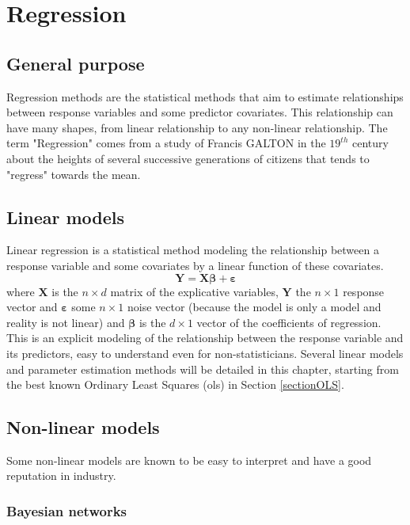 \documentclass[12pt,a4paper]{report}
\begin{document}
\section{Regression}
	\subsection{General purpose}
		Regression methods are the statistical methods that aim to estimate relationships between response variables and some predictor covariates. This relationship can have many shapes, from linear relationship to any non-linear relationship. The term "Regression" comes from a study of Francis GALTON in the $19^{th}$ century about the heights of several successive generations of citizens that tends to "regress" towards the mean. 
	
	\subsection{Linear models}
       Linear regression is a statistical method modeling the relationship between a response variable and some covariates by a linear function of these covariates.
			\begin{equation}
				\boldsymbol{Y}=\boldsymbol{X}\boldsymbol{\beta} + \boldsymbol{\varepsilon}
			\end{equation}
			where $\boldsymbol{X}$ is the $n\times d$ matrix of the explicative variables, %
	 $\boldsymbol{Y}$ the  $n\times 1$ response vector and $\boldsymbol{\varepsilon}$ some $n\times 1$ noise vector (because the model is only a model and reality is not linear) and $\boldsymbol{\beta}$ is the $d\times 1$ vector of the coefficients of regression. This is an explicit modeling of the relationship between the response variable and its predictors, easy to understand even for non-statisticians. Several linear models and parameter estimation methods will be detailed in this chapter, starting from the best known Ordinary Least Squares ({\sc ols}) in Section \ref{sectionOLS}.
	\subsection{Non-linear models}\label{cart}
	Some non-linear models are known to be easy to interpret and have a good reputation in industry.
		\subsubsection{Bayesian networks}
		
\end{document}
